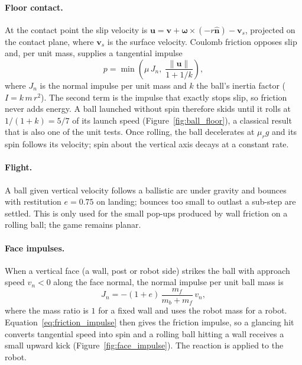 \paragraph{Floor contact.}
At the contact point the slip velocity is
$\mathbf{u} = \mathbf{v} + \boldsymbol{\omega}\times(-r\hat{\mathbf n}) - \mathbf{v}_s$,
projected on the contact plane, where $\mathbf v_s$ is the surface velocity.
Coulomb friction opposes slip and, per unit mass, supplies a tangential impulse
\begin{equation}
    p = \min\!\left(\mu\,J_n,\; \frac{\lVert\mathbf u\rVert}{1 + 1/k}\right),
    \label{eq:friction_impulse}
\end{equation}
where $J_n$ is the normal impulse per unit mass and $k$ the ball's inertia factor
($I = k\,m\,r^2$).  The second term is the impulse that exactly stops slip, so
friction never adds energy.  A ball launched without spin therefore skids until it
rolls at $1/(1+k) = 5/7$ of its launch speed (Figure~\ref{fig:ball_floor}), a classical
result that is also one of the unit tests.  Once rolling, the ball decelerates at $\mu_r g$ and its spin
follows its velocity; spin about the vertical axis decays at a constant rate.



\paragraph{Flight.}
A ball given vertical velocity follows a ballistic arc under gravity and bounces
with restitution $e = 0.75$ on landing; bounces too small to outlast a sub-step
are settled.  This is only used for the small pop-ups produced by wall friction
on a rolling ball; the game remains planar.

\paragraph{Face impulses.}
When a vertical face (a wall, post or robot side) strikes the ball with approach
speed $v_n<0$ along the face normal, the normal impulse per unit ball mass is
\begin{equation}
    J_n = -(1+e)\,\frac{m_f}{m_b + m_f}\,v_n ,
\end{equation}
where the mass ratio is $1$ for a fixed wall and uses the robot mass for a robot.
Equation~\eqref{eq:friction_impulse} then gives the friction impulse, so a
glancing hit converts tangential speed into spin and a rolling ball hitting a
wall receives a small upward kick (Figure~\ref{fig:face_impulse}).  The reaction is applied to the robot.

